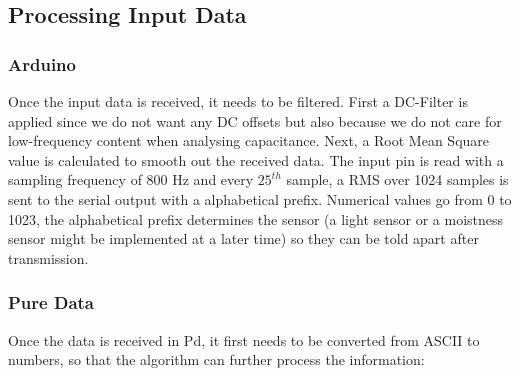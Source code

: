 \subsection{Processing Input Data}
\subsubsection{Arduino}
Once the input data is received, it needs to be filtered. First a DC-Filter is applied since we do not want any DC offsets but also because we do not care for low-frequency content when analysing capacitance. Next, a Root Mean Square value is calculated to smooth out the received data. The input pin is read with a sampling frequency of 800 Hz and every $25^{th}$ sample, a RMS over 1024 samples is sent to the serial output with a alphabetical prefix. Numerical values go from 0 to 1023, the alphabetical prefix determines the sensor (a light sensor or a moistness sensor might be implemented at a later time) so they can be told apart after transmission. 
\subsubsection{Pure Data}
Once the data is received in Pd, it first needs to be converted from ASCII to numbers, so that the algorithm can further process the information:

